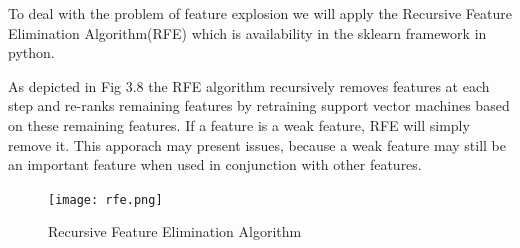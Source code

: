 To deal with the problem of feature explosion we will apply the Recursive Feature Elimination Algorithm(RFE) which is availability in the sklearn framework in python. 

As depicted in Fig 3.8 the RFE  algorithm recursively removes features at each step and re-ranks remaining features by retraining support vector machines based on these remaining features. If a feature is a weak feature, RFE will simply remove it. This apporach may present issues, because a weak feature may still be an important feature when used in conjunction with other features. 

\begin{figure}[h]
\centering
\texttt{[image: rfe.png]}
\caption{Recursive Feature Elimination Algorithm \cite{Furianello}}
\end{figure}
